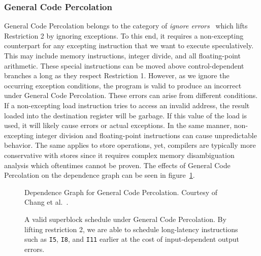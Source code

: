 \subsubsection{General Code Percolation}
General Code Percolation belongs to the category of \textit{ignore errors}~\cite{bringmannMH95} which lifts Restriction 2 by ignoring exceptions. To this end, it requires a non-excepting counterpart for any excepting instruction that we want to execute speculatively. This may include memory instructions, integer divide, and all floating-point arithmetic. These special instructions can be moved above control-dependent branches a long as they respect Restriction 1. However, as we ignore the occurring exception conditions, the program is valid to produce an incorrect under General Code Percolation. These errors can arise from different conditions. If a non-excepting load instruction tries to access an invalid address, the result loaded into the destination register will be garbage. If this value of the load is used, it will likely cause errors or actual exceptions. In the same manner, non-excepting integer division and floating-point instructions can cause unpredictable behavior.  The same applies to store operations, yet, compilers are typically more conservative with stores since it requires complex memory disambiguation analysis which oftentimes cannot be proven. The effects of General Code Percolation on the dependence graph can be seen in figure~\ref{fig:general_cfg}. 

\begin{center}
    \begin{minipage}{.52\textwidth}
        \begin{figure}[H]
            \centering
            
            \caption[Dependence Graph for General Code Percolation]{Dependence Graph for General Code Percolation. Courtesy of Chang et al.~\cite{chang95}.}
            \label{fig:general_cfg}
\end{figure}
    \end{minipage}\hfill
    \begin{minipage}{.46\textwidth}
\begin{figure}[H]
            \centering
            \resizebox{1\textwidth}{!}{
            
        }
        \caption[Schedule for General Code Percolation]{A valid superblock schedule under General Code Percolation. By lifting restriction 2, we are able to schedule long-latency instructions such as \texttt{I5}, \texttt{I8}, and \texttt{I11} earlier at the cost of input-dependent output errors.}
        \label{fig:general_motion}
\end{figure}
    \end{minipage}
\end{center} 

